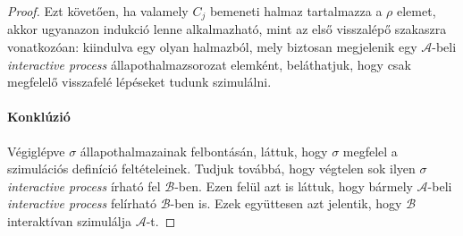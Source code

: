 \documentclass[12pt]{article}
\theoremstyle{definition}
\theoremstyle{remark}
\theoremstyle{plain}
\theoremstyle{remark}
\theoremstyle{plain}
\begin{document}
\begin{proof}
        Ezt követően, ha valamely $C_{j}$ bemeneti halmaz tartalmazza a $\rho$ elemet, akkor ugyanazon indukció lenne alkalmazható, mint az első visszalépő szakaszra vonatkozóan: kiindulva egy olyan halmazból, mely biztosan megjelenik egy $\mathscr{A}$-beli \textit{interactive process} állapothalmazsorozat elemként, beláthatjuk, hogy csak megfelelő visszafelé lépéseket tudunk szimulálni.
        
        \paragraph{Konklúzió}
        Végiglépve $\sigma$ állapothalmazainak felbontásán, láttuk, hogy $\sigma$ megfelel a szimulációs definíció feltételeinek. Tudjuk továbbá, hogy végtelen sok ilyen $\sigma$ \textit{interactive process} írható fel $\mathscr{B}$-ben. Ezen felül azt is láttuk, hogy bármely $\mathscr{A}$-beli \textit{interactive process} felírható $\mathscr{B}$-ben is. Ezek együttesen azt jelentik, hogy $\mathscr{B}$ interaktívan szimulálja $\mathscr{A}$-t.
    \end{proof}
\end{document}
